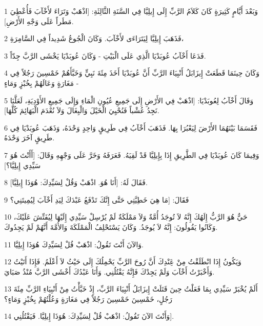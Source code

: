 \par 1 وَبَعْدَ أَيَّامٍ كَثِيرَةٍ كَانَ كَلاَمُ الرَّبِّ إِلَى إِيلِيَّا فِي السَّنَةِ الثَّالِثَةِ: [اذْهَبْ وَتَرَاءَ لأَخْآبَ فَأُعْطِيَ مَطَراً عَلَى وَجْهِ الأَرْضِ].
\par 2 فَذَهَبَ إِيلِيَّا لِيَتَرَاءَى لأَخْآبَ. وَكَانَ الْجُوعُ شَدِيداً فِي السَّامِرَةِ،
\par 3 فَدَعَا أَخْآبُ عُوبَدْيَا الَّذِي عَلَى الْبَيْتِ - وَكَانَ عُوبَدْيَا يَخْشَى الرَّبَّ جِدّاً.
\par 4 وَكَانَ حِينَمَا قَطَعَتْ إِيزَابَلُ أَنْبِيَاءَ الرَّبِّ أَنَّ عُوبَدْيَا أَخَذَ مِئَةَ نَبِيٍّ وَخَبَّأَهُمْ خَمْسِينَ رَجُلاً فِي مَغَارَةٍ وَعَالَهُمْ بِخُبْزٍ وَمَاءٍ -
\par 5 وَقَالَ أَخْآبُ لِعُوبَدْيَا: [اذْهَبْ فِي الأَرْضِ إِلَى جَمِيعِ عُيُونِ الْمَاءِ وَإِلَى جَمِيعِ الأَوْدِيَةِ، لَعَلَّنَا نَجِدُ عُشْباً فَنُحْيِيَ الْخَيْلَ وَالْبِغَالَ وَلاَ نُعْدَمَ الْبَهَائِمَ كُلَّهَا].
\par 6 فَقَسَمَا بَيْنَهُمَا الأَرْضَ لِيَعْبُرَا بِهَا. فَذَهَبَ أَخْآبُ فِي طَرِيقٍ وَاحِدٍ وَحْدَهُ، وَذَهَبَ عُوبَدْيَا فِي طَرِيقٍ آخَرَ وَحْدَهُ.
\par 7 وَفِيمَا كَانَ عُوبَدْيَا فِي الطَّرِيقِ إِذَا بِإِيلِيَّا قَدْ لَقِيَهُ. فَعَرَفَهُ وَخَرَّ عَلَى وَجْهِهِ وَقَالَ: [أَأَنْتَ هُوَ سَيِّدِي إِيلِيَّا؟]
\par 8 فَقَالَ لَهُ: [أَنَا هُوَ. اذْهَبْ وَقُلْ لِسَيِّدِكَ: هُوَذَا إِيلِيَّا].
\par 9 فَقَالَ: [مَا هِيَ خَطِيَّتِي حَتَّى إِنَّكَ تَدْفَعُ عَبْدَكَ لِيَدِ أَخْآبَ لِيُمِيتَنِي؟
\par 10 حَيٌّ هُوَ الرَّبُّ إِلَهُكَ إِنَّهُ لاَ تُوجَدُ أُمَّةٌ وَلاَ مَمْلَكَةٌ لَمْ يُرْسِلْ سَيِّدِي إِلَيْهَا لِيُفَتِّشَ عَلَيْكَ، وَكَانُوا يَقُولُونَ: إِنَّهُ لاَ يُوجَدُ. وَكَانَ يَسْتَحْلِفُ الْمَمْلَكَةَ وَالأُمَّةَ أَنَّهُمْ لَمْ يَجِدُوكَ.
\par 11 وَالآنَ أَنْتَ تَقُولُ: اذْهَبْ قُلْ لِسَيِّدِكَ هُوَذَا إِيلِيَّا.
\par 12 وَيَكُونُ إِذَا انْطَلَقْتُ مِنْ عَِنْدِكَ أَنَّ رُوحَ الرَّبِّ يَحْمِلُكَ إِلَى حَيْثُ لاَ أَعْلَمُ. فَإِذَا أَتَيْتُ وَأَخْبَرْتُ أَخْآبَ وَلَمْ يَجِدْكَ فَإِنَّهُ يَقْتُلُنِي. وَأَنَا عَبْدُكَ أَخْشَى الرَّبَّ مُنْذُ صَبَايَ.
\par 13 أَلَمْ يُخْبَرْ سَيِّدِي بِمَا فَعَلْتُ حِينَ قَتَلَتْ إِيزَابَلُ أَنْبِيَاءَ الرَّبِّ، إِذْ خَبَّأْتُ مِنْ أَنْبِيَاءِ الرَّبِّ مِئَةَ رَجُلٍ، خَمْسِينَ خَمْسِينَ رَجُلاً فِي مَغَارَةٍ وَعُلْتُهُمْ بِخُبْزٍ وَمَاءٍ؟
\par 14 وَأَنْتَ الآنَ تَقُولُ: اذْهَبْ قُلْ لِسَيِّدِكَ: هُوَذَا إِيلِيَّا. فَيَقْتُلُنِي].
